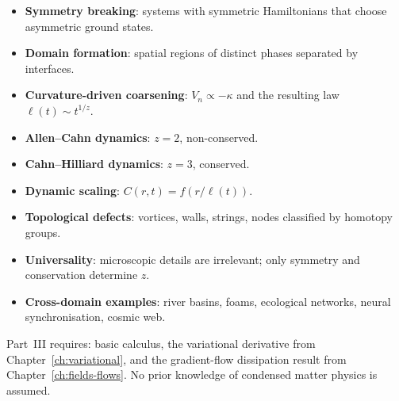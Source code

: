 \begin{tcolorbox}[
  title={\textbf{New Ideas Introduced in This Part}},
  colback=boxblue,colframe=blue!40!black,
  fonttitle=\small\sffamily
]
\begin{itemize}[leftmargin=1.5em,itemsep=2pt]
  \item \textbf{Symmetry breaking}: systems with symmetric
    Hamiltonians that choose asymmetric ground states.
  \item \textbf{Domain formation}: spatial regions of distinct
    phases separated by interfaces.
  \item \textbf{Curvature-driven coarsening}: $V_n \propto -\kappa$
    and the resulting law $\ell(t) \sim t^{1/z}$.
  \item \textbf{Allen--Cahn dynamics}: $z = 2$, non-conserved.
  \item \textbf{Cahn--Hilliard dynamics}: $z = 3$, conserved.
  \item \textbf{Dynamic scaling}: $C(r,t) = f(r/\ell(t))$.
  \item \textbf{Topological defects}: vortices, walls, strings,
    nodes classified by homotopy groups.
  \item \textbf{Universality}: microscopic details are irrelevant;
    only symmetry and conservation determine $z$.
  \item \textbf{Cross-domain examples}: river basins, foams,
    ecological networks, neural synchronisation, cosmic web.
\end{itemize}
\end{tcolorbox}

\bigskip

\begin{tcolorbox}[
  title={\textbf{Dependencies}},
  colback=boxgray,colframe=gray!50!black,
  fonttitle=\small\sffamily
]
Part~III requires: basic calculus, the variational derivative
from Chapter~\ref{ch:variational}, and the gradient-flow
dissipation result from Chapter~\ref{ch:fields-flows}.
No prior knowledge of condensed matter physics is assumed.
\end{tcolorbox}

\bigskip


